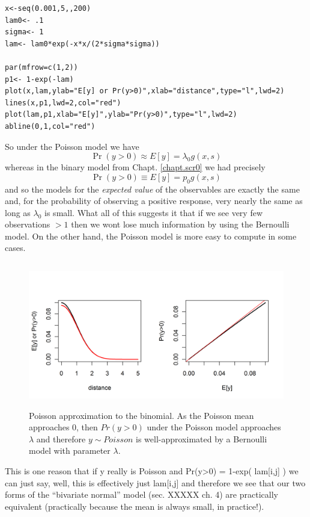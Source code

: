 {\small
\begin{verbatim}
x<-seq(0.001,5,,200)
lam0<- .1
sigma<- 1
lam<- lam0*exp(-x*x/(2*sigma*sigma))

par(mfrow=c(1,2))
p1<- 1-exp(-lam)
plot(x,lam,ylab="E[y] or Pr(y>0)",xlab="distance",type="l",lwd=2)
lines(x,p1,lwd=2,col="red")
plot(lam,p1,xlab="E[y]",ylab="Pr(y>0)",type="l",lwd=2)
abline(0,1,col="red")
\end{verbatim}
}


So under the Poisson model we have
\[
\Pr(y>0) \approx E[y] = \lambda_{0} g(x,s)
\]
whereas in the binary model from Chapt. \ref{chapt.scr0} we had
precisely 
\[
\Pr(y>0) \equiv E[y] = p_{0} g(x,s)
\]
and so the models for the {\it expected value} of the observables
are exactly the same and, for the probability of observing a positive
response, very nearly the same as 
long as $\lambda_{0}$ is small.
What all of this suggests it that
if we see very few observations $>1$ then we wont lose much
information by using the Bernoulli model. On the other hand, the
Poisson model is more easy to compute in some cases. 


\begin{figure}
\centering
\includegraphics[width=5in,height=2.5in]{Ch5/figs/Poisson-Bern.png}
\caption{Poisson approximation to the binomial. As the Poisson mean
  approaches 0, then $Pr(y>0)$ under the Poisson model approaches
  $\lambda$ and therefore $y \sim Poisson$ is well-approximated by a
  Bernoulli model with parameter $\lambda$. 
}
\label{poisson-mn.fig.poissonbern}
\end{figure}

This is one reason that if y really is Poisson and Pr(y>0) =
1-exp( lam[i,j] ) we can just say, well, this is effectively just
lam[i,j] and therefore we see that our two forms of the ``bivariate
normal'' model (sec. XXXXX ch. 4) are practically equivalent
(practically because the mean is always small, in practice!). 


